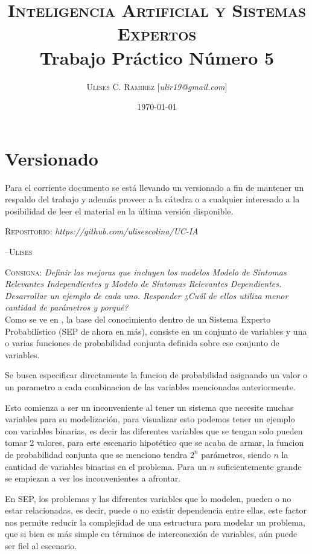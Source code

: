 \documentclass{article}
\title{\textsc{Inteligencia Artificial y Sistemas Expertos}\\Trabajo Práctico
Número 5}
\author{\textsc{Ulises C. Ramirez} [\textit{ulir19@gmail.com}]}
\date{\today}
\begin{document}
\maketitle
{}
\newpage

\section*{Versionado}
Para el corriente documento se est\'a llevando un versionado a fin de mantener
un respaldo del trabajo y adem\'as proveer a la c\'atedra o a cualquier
interesado a la posibilidad de leer el material en la \'ultima versi\'on disponible.\\

\begin{center}
  \textsc{Repositorio}: \textit{https://github.com/ulisescolina/UC-IA}
\end{center}

\hfill--\textsc{Ulises}
\tableofcontents
{}
\newpage

\textsc{Consigna}: \textit{
Definir las mejoras que incluyen los modelos Modelo de Síntomas Relevantes
Independientes y Modelo de Síntomas Relevantes Dependientes. Desarrollar un
ejemplo de cada uno. Responder ¿Cuál de ellos utiliza menor cantidad de
parámetros y porqué?}
\\

Como se ve en \cite{ia-sep}, la base del conocimiento dentro de un Sistema Experto
Probabilístico (SEP de ahora en más), consiste en un conjunto de variables y una o
varias funciones de probabilidad conjunta definida sobre ese conjunto de variables.

Se busca especificar directamente la funcion de probabilidad asignando un valor
o un parametro a cada combinacion de las variables mencionadas anteriormente.

Esto comienza a ser un inconveniente al tener un sistema que necesite muchas
variables para su modelización, para visualizar esto podemos tener un ejemplo
con variables binarias, es decir las diferentes variables que se tengan solo
pueden tomar 2 valores, para este escenario hipotético que se acaba de armar,
la funcion de probabilidad conjunta que se menciono tendra $2^{n}$ parámetros,
siendo $n$ la cantidad de variables binarias en el problema. Para un $n$
suficientemente grande se empiezan a ver los inconvenientes a afrontar.

En SEP, los problemas y las diferentes variables que lo modelen, pueden o no
estar relacionadas, es decir, puede o no existir dependencia entre ellas, este
factor nos permite reducir la complejidad de una estructura para modelar un
problema, que si bien es más simple en términos de interconexión de variables,
aún puede ser fiel al escenario.
\end{document}
